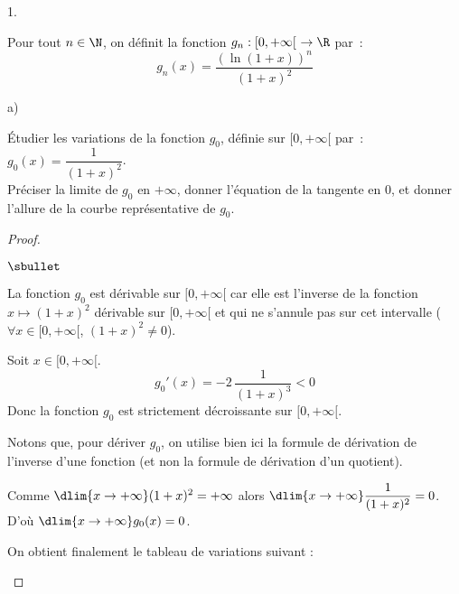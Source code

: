 \documentclass[11pt]{article}%
\begin{document}
\begin{noliste}{1.}
  \setlength{\itemsep}{2mm}
\item Pour tout $n \in \N$, on définit la fonction $g_n : [0,+\infty[
  \ \rightarrow \R$ par~:
  \[ 
  g_n(x) = \dfrac{( \ln(1+x))^n}{(1+x)^2} 
  \]

\begin{noliste}{a)}
\item Étudier les variations de la fonction $g_0$, définie sur 
$[0,+\infty[$ par~: $g_0(x) = \dfrac{1}{(1+x)^2}$.\\ 
Préciser la limite de $g_0$ en $+\infty$, donner l'équation de la 
tangente en $0$, et donner l'allure de la courbe représentative de 
$g_0$.

\begin{proof}~
 \begin{noliste}{$\sbullet$}
 \item La fonction $g_0$ est dérivable sur $[0, +\infty[$ car elle est
   l'inverse de la fonction $x \mapsto (1+x)^2$ dérivable sur $[0,
   +\infty[$ et qui ne s'annule pas sur cet intervalle ($\forall x\in
   [0,+\infty[$, $(1+x)^2 \neq 0$).
  
  \item Soit $x\in [0,+\infty[$.
  \[
   g_0'(x) = -2 \, \dfrac{1}{(1+x)^3} <0
  \]
  Donc la fonction $g_0$ est strictement décroissante sur $[0,+\infty[$.
  \begin{remark}
    Notons que, pour dériver $g_0$, on utilise bien ici la formule de
    dérivation de l'inverse d'une fonction (et non la formule de
    dérivation d'un quotient).
  \end{remark}
  
\item Comme $\dlim{x\to+\infty} (1+x)^2=+\infty$ alors $\dlim{x\to
    +\infty} \dfrac{1}{(1+x)^2}=0$. D'où $\dlim{x\to+\infty}
  g_0(x)=0$.
  
  \item On obtient finalement le tableau de variations suivant :
  
  \begin{center}
     \end{center}
     

\end{noliste}
\end{proof}
\end{noliste}
\end{noliste}
\end{document}
